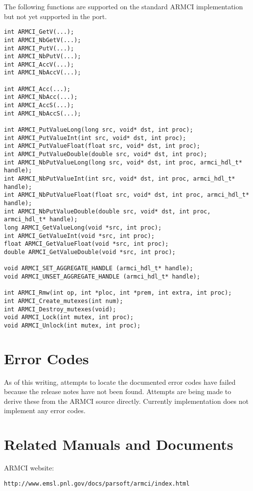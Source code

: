\documentclass[10pt]{article}
\begin{document}
The following functions are supported on the standard ARMCI
implementation but not yet supported in the \charmpp{} port.

\begin{verbatim}
int ARMCI_GetV(...);
int ARMCI_NbGetV(...);
int ARMCI_PutV(...);
int ARMCI_NbPutV(...);
int ARMCI_AccV(...);
int ARMCI_NbAccV(...);

int ARMCI_Acc(...);
int ARMCI_NbAcc(...);
int ARMCI_AccS(...);
int ARMCI_NbAccS(...);

int ARMCI_PutValueLong(long src, void* dst, int proc);
int ARMCI_PutValueInt(int src, void* dst, int proc);
int ARMCI_PutValueFloat(float src, void* dst, int proc);
int ARMCI_PutValueDouble(double src, void* dst, int proc);
int ARMCI_NbPutValueLong(long src, void* dst, int proc, armci_hdl_t* handle);
int ARMCI_NbPutValueInt(int src, void* dst, int proc, armci_hdl_t* handle);
int ARMCI_NbPutValueFloat(float src, void* dst, int proc, armci_hdl_t* handle);
int ARMCI_NbPutValueDouble(double src, void* dst, int proc, armci_hdl_t* handle);
long ARMCI_GetValueLong(void *src, int proc);
int ARMCI_GetValueInt(void *src, int proc);
float ARMCI_GetValueFloat(void *src, int proc);
double ARMCI_GetValueDouble(void *src, int proc);

void ARMCI_SET_AGGREGATE_HANDLE (armci_hdl_t* handle);
void ARMCI_UNSET_AGGREGATE_HANDLE (armci_hdl_t* handle);

int ARMCI_Rmw(int op, int *ploc, int *prem, int extra, int proc);
int ARMCI_Create_mutexes(int num);
int ARMCI_Destroy_mutexes(void);
void ARMCI_Lock(int mutex, int proc);
void ARMCI_Unlock(int mutex, int proc);
\end{verbatim}

\section{Error Codes}
\label{sec::error codes}

As of this writing, attempts to locate the documented error codes have
failed because the release notes have not been found. Attempts are
being made to derive these from the ARMCI source directly. Currently
\charmpp{} implementation does not implement any error codes.

\section{Related Manuals and Documents}
\label{sec::related doc}

\noindent
ARMCI website:
\begin{verbatim}
http://www.emsl.pnl.gov/docs/parsoft/armci/index.html
\end{verbatim}
\end{document}
